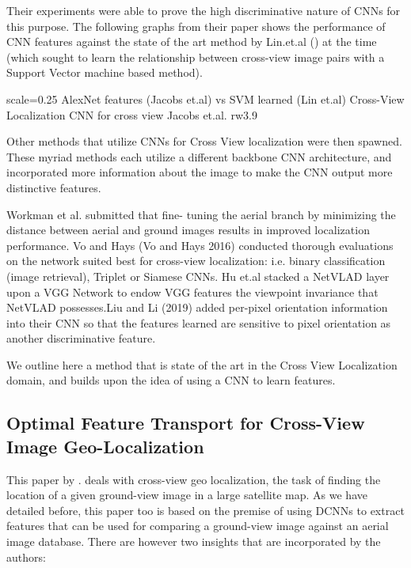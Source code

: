 Their experiments were able to prove the high discriminative nature of CNNs for this purpose. The following graphs from their paper shows the performance of CNN features against the state of the art method by Lin.et.al (\cite{Lin2013}) at the time (which sought to learn the relationship between cross-view image pairs with a Support Vector machine based method).

{scale=0.25}%
{AlexNet features (Jacobs et.al) vs SVM learned (Lin et.al) Cross-View Localization}%
{CNN for cross view Jacobs et.al.}%
{rw3.9} %

Other methods that utilize CNNs for Cross View localization were then spawned. These myriad methods each utilize a different backbone CNN architecture, and incorporated more information about the image to make the CNN output more distinctive features.

Workman et al. submitted that fine- tuning the aerial branch by minimizing the distance between aerial and ground images results in improved localization performance.  Vo and Hays (Vo and Hays 2016) conducted thorough evaluations on the network suited best for cross-view localization: i.e. binary classification (image retrieval), Triplet or Siamese CNNs. Hu et.al stacked a NetVLAD layer upon a VGG Network to endow VGG features the viewpoint invariance that NetVLAD possesses.Liu and Li (2019) added per-pixel orientation information into their CNN so that the features learned are sensitive to pixel orientation as another discriminative feature. 

We outline here a method that is state of the art in the Cross View Localization domain, and builds upon the idea of using a CNN to learn features. 

\subsection{Optimal Feature Transport for Cross-View Image Geo-Localization}
This paper by \cite{Shi2019}. deals with cross-view geo localization, the task of finding the location of a given ground-view image in a large satellite map. As we have detailed before, this paper too is based on the premise of using DCNNs to extract features that can be used for comparing a ground-view image against an aerial image database. There are however two insights that are incorporated by the authors:

